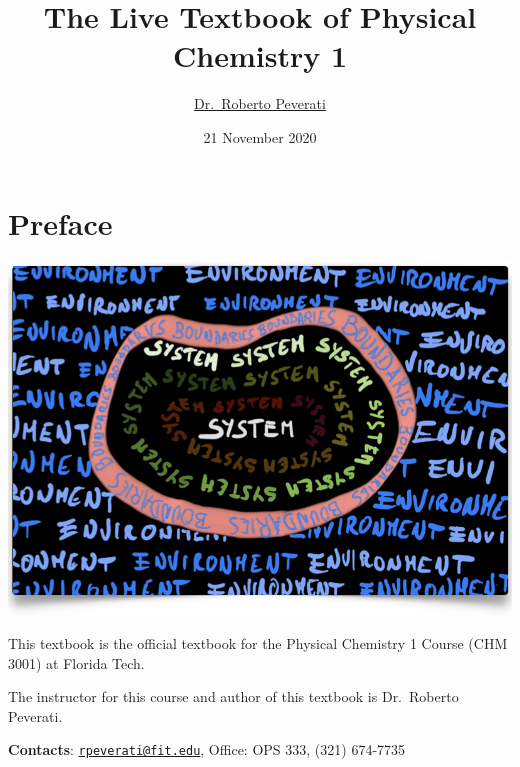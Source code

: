 \documentclass[
  9pt,
]{extbook}
\title{The Live Textbook of Physical Chemistry 1}
\author{\href{mailto:rpeverati@fit.edu}{Dr.~Roberto Peverati}}
\date{21 November 2020}
\let\oldmaketitle\maketitle
\theoremstyle{definition}
\theoremstyle{definition}
\theoremstyle{definition}
\theoremstyle{remark}
\begin{document}
\maketitle


%
\newpage

\let\maketitle\oldmaketitle

\renewcommand\thepage{\romannumeral\numexpr\value{page}-1\relax}


{
\setcounter{tocdepth}{1}
\tableofcontents
}
\renewcommand{\arraystretch}{1.8}

\hypertarget{preface}{%
\chapter*{Preface}\label{preface}}

\begin{center}\includegraphics[width=0.8\linewidth]{./img/OEP_Figures.000} \end{center}

This textbook is the official textbook for the Physical Chemistry 1 Course (CHM 3001) at Florida Tech.

The instructor for this course and author of this textbook is Dr.~Roberto Peverati.

\textbf{Contacts}: \href{mailto:rpeverati@fit.edu}{\nolinkurl{rpeverati@fit.edu}}, Office: OPS 333, (321) 674-7735
\end{document}
